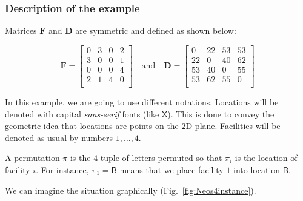 \subsubsection{Description of the example}
 Matrices $\bm F$ and $\bm D$ are symmetric and defined as shown below:

\[
\bm F = \begin{bmatrix}
0 & 3 & 0 & 2 \\
3& 0  & 0 & 1 \\
0& 0   & 0  & 4 \\
2& 1   & 4   & 0   \\
\end{bmatrix} 
\quad 
\text{and}
\quad
\bm D = \begin{bmatrix}
0 & 22 & 53 & 53 \\
22  & 0  & 40 & 62 \\
53  & 40   & 0  & 55 \\
53  &  62  & 55   & 0   \\
\end{bmatrix}
\]

In this example, we are going to use different notations. Locations will be denoted with capital \textit{sans-serif} fonts (like $\mathsf{X}$). This is done to convey the geometric idea that locations are points on the $2$D-plane. Facilities will be denoted as usual by numbers $1,\dots,4$.




A permutation $\pi$ is the $4$-tuple of letters permuted so that $\pi_i$ is the location of facility $i$. For instance, $\pi_1 = \mathsf B$ means that we place facility $1$ into location $\mathsf{B}$.

We can imagine the situation graphically (Fig.~\ref{fig:Neos4instance}).


